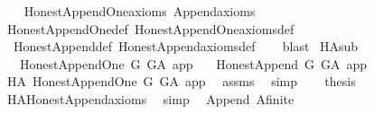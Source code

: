 \begin{isabellebody}
%
\isadelimproof
\ \ %
\endisadelimproof
%
\isatagproof
{}\isamarkupfalse%
\ Honest{\isacharunderscore}{\kern0pt}Append{\isacharunderscore}{\kern0pt}One{\isacharunderscore}{\kern0pt}axioms\ Append{\isacharunderscore}{\kern0pt}axioms\isanewline
\ \ \isamarkupfalse%
\ Honest{\isacharunderscore}{\kern0pt}Append{\isacharunderscore}{\kern0pt}One{\isacharunderscore}{\kern0pt}def\ Honest{\isacharunderscore}{\kern0pt}Append{\isacharunderscore}{\kern0pt}One{\isacharunderscore}{\kern0pt}axioms{\isacharunderscore}{\kern0pt}def\ \isanewline
\ \ Honest{\isacharunderscore}{\kern0pt}Append{\isacharunderscore}{\kern0pt}def\ Honest{\isacharunderscore}{\kern0pt}Append{\isacharunderscore}{\kern0pt}axioms{\isacharunderscore}{\kern0pt}def\isanewline
\ \ \isamarkupfalse%
\ blast%
\endisatagproof
{\isafoldproof}%
%
\isadelimproof
\isanewline
%
\endisadelimproof
\isanewline
{}\isamarkupfalse%
\ HA{}{\isacharunderscore}{\kern0pt}sub{\isacharcolon}{\kern0pt}\isanewline
\ \ \ {\isachardoublequoteopen}Honest{\isacharunderscore}{\kern0pt}Append{\isacharunderscore}{\kern0pt}One\ G\ G{\isacharunderscore}{\kern0pt}A\ app{\isachardoublequoteclose}\isanewline
\ \ \ {\isachardoublequoteopen}Honest{\isacharunderscore}{\kern0pt}Append\ G\ G{\isacharunderscore}{\kern0pt}A\ {\isacharbraceleft}{\kern0pt}app{\isacharbraceright}{\kern0pt}{\isachardoublequoteclose}\isanewline
%
\isadelimproof
%
\endisadelimproof
%
\isatagproof
{}\isamarkupfalse%
\ {\isacharminus}{\kern0pt}\isanewline
\ \ \isamarkupfalse%
\ HA{}{\isacharcolon}{\kern0pt}\ Honest{\isacharunderscore}{\kern0pt}Append{\isacharunderscore}{\kern0pt}One\ G\ G{\isacharunderscore}{\kern0pt}A\ app\ \isamarkupfalse%
\ assms\ \isamarkupfalse%
\ simp\isanewline
\ \ \isamarkupfalse%
\ {\isacharquery}{\kern0pt}thesis\ \isamarkupfalse%
\ HA{}{\isachardot}{\kern0pt}Honest{\isacharunderscore}{\kern0pt}Append{\isacharunderscore}{\kern0pt}axioms\ \isamarkupfalse%
\ simp\isanewline
{}\isamarkupfalse%
%
\endisatagproof
{\isafoldproof}%
%
\isadelimproof
%
\endisadelimproof
%
\isadelimdocument
%
\endisadelimdocument
%
\isatagdocument
%
\isamarkuptrue%
%
\endisatagdocument
{\isafolddocument}%
%
\isadelimdocument
%
\endisadelimdocument
{}\isamarkupfalse%
\ {\isacharparenleft}{\kern0pt}\ Append{\isacharparenright}{\kern0pt}\ A{\isacharunderscore}{\kern0pt}finite{\isacharcolon}{\kern0pt}\isanewline

\end{isabellebody}
